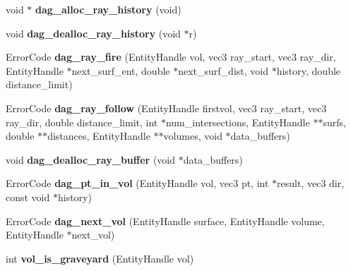 \begin{DoxyCompactItemize}
\item 
void $\ast$ {\bfseries dag\+\_\+alloc\+\_\+ray\+\_\+history} (void)\hypertarget{namespacepyne_afa68eb50ccf4aa327937219dd3c05e02}{}\label{namespacepyne_afa68eb50ccf4aa327937219dd3c05e02}

\item 
void {\bfseries dag\+\_\+dealloc\+\_\+ray\+\_\+history} (void $\ast$r)\hypertarget{namespacepyne_a9243f772bbf6b63bac405c28328dd253}{}\label{namespacepyne_a9243f772bbf6b63bac405c28328dd253}

\item 
Error\+Code {\bfseries dag\+\_\+ray\+\_\+fire} (Entity\+Handle vol, vec3 ray\+\_\+start, vec3 ray\+\_\+dir, Entity\+Handle $\ast$next\+\_\+surf\+\_\+ent, double $\ast$next\+\_\+surf\+\_\+dist, void $\ast$history, double distance\+\_\+limit)\hypertarget{namespacepyne_a64c30defae1f7780ea4a3e1cb16a7a79}{}\label{namespacepyne_a64c30defae1f7780ea4a3e1cb16a7a79}

\item 
Error\+Code {\bfseries dag\+\_\+ray\+\_\+follow} (Entity\+Handle firstvol, vec3 ray\+\_\+start, vec3 ray\+\_\+dir, double distance\+\_\+limit, int $\ast$num\+\_\+intersections, Entity\+Handle $\ast$$\ast$surfs, double $\ast$$\ast$distances, Entity\+Handle $\ast$$\ast$volumes, void $\ast$data\+\_\+buffers)\hypertarget{namespacepyne_afc692d9c804c22e7e6b3a30d2d852296}{}\label{namespacepyne_afc692d9c804c22e7e6b3a30d2d852296}

\item 
void {\bfseries dag\+\_\+dealloc\+\_\+ray\+\_\+buffer} (void $\ast$data\+\_\+buffers)\hypertarget{namespacepyne_a9451bba0ed3cd9857c7452cec04ab031}{}\label{namespacepyne_a9451bba0ed3cd9857c7452cec04ab031}

\item 
Error\+Code {\bfseries dag\+\_\+pt\+\_\+in\+\_\+vol} (Entity\+Handle vol, vec3 pt, int $\ast$result, vec3 dir, const void $\ast$history)\hypertarget{namespacepyne_ae69cdb5021f7dd38def0bbebaa3a99b3}{}\label{namespacepyne_ae69cdb5021f7dd38def0bbebaa3a99b3}

\item 
Error\+Code {\bfseries dag\+\_\+next\+\_\+vol} (Entity\+Handle surface, Entity\+Handle volume, Entity\+Handle $\ast$next\+\_\+vol)\hypertarget{namespacepyne_a83bf77ef33027053fa8ddec223554641}{}\label{namespacepyne_a83bf77ef33027053fa8ddec223554641}

\item 
int {\bfseries vol\+\_\+is\+\_\+graveyard} (Entity\+Handle vol)\hypertarget{namespacepyne_a7844def8817d3880424ed61a474ec8ab}{}\label{namespacepyne_a7844def8817d3880424ed61a474ec8ab}


\end{DoxyCompactItemize}
